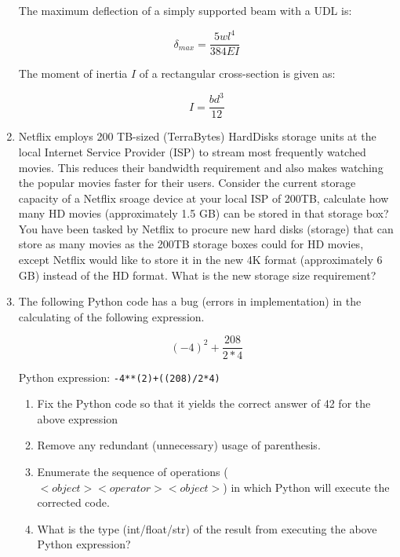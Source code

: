 \documentclass[a4paper,12pt]{article}
\begin{document}
\begin{enumerate}
	The maximum deflection of a simply supported beam with a UDL is:
	
	\begin{equation*}
		\delta_{max} = \frac{5wl^4}{384EI}
	\end{equation*}
	
	The moment of inertia $I$ of a rectangular cross-section is given as:
	
	\begin{equation}
		I = \frac{b d^3}{12}
	\end{equation}
	
	\item Netflix employs 200 TB-sized (TerraBytes) HardDisks storage units at the local Internet Service Provider (ISP) to stream most frequently watched movies. This reduces their bandwidth requirement and also makes watching the popular movies faster for their users. Consider the current storage capacity of a Netflix sroage device at your local ISP of 200TB, calculate how many HD movies (approximately 1.5 GB) can be stored in that storage box? You have been tasked by Netflix to procure new hard disks (storage) that can store as many movies as the 200TB storage boxes could for HD movies, except Netflix would like to store it in the new 4K format (approximately 6 GB) instead of the HD format. What is the new storage size requirement?
	
	\item The following Python code has a bug (errors in implementation) in the calculating of the following expression.
		
	\begin{equation*}
	(-4)^2 + \frac{208}{2 * 4}
	\end{equation*}

	Python expression: \verb|-4**(2)+((208)/2*4)|
	
	\begin{enumerate}
		\item Fix the Python code so that it yields the correct answer of 42 for the above expression
		
		\item Remove any redundant (unnecessary) usage of parenthesis. 
		
		\item Enumerate the sequence of operations ($<object><operator><object>$) in which Python will execute the corrected code.
		
		\item What is the type (int/float/str) of the result from executing the above Python expression?
	\end{enumerate}
\end{enumerate}
\end{document}
